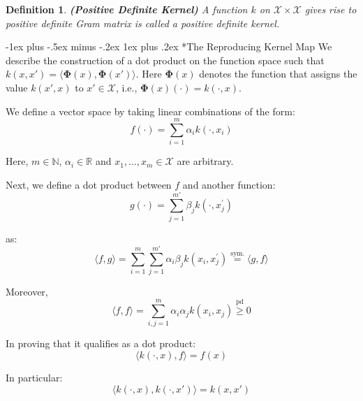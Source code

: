 \documentclass[10pt,landscape]{article}
\makeatletter
\newtheorem*{definition*}{Definition}
\renewcommand{\subsubsection}{\@startsection{subsubsection}{3}{0mm}%
                                {-1ex plus -.5ex minus -.2ex}%
                                {1ex plus .2ex}%
                                {\normalfont\small\bfseries}}
\makeatother
\begin{document}
\begin{multicols}{3}
\begin{definition*}
\textbf{(Positive Definite Kernel)} A function $k$ on $\mathcal{X} \times \mathcal{X}$ gives rise to positive definite Gram matrix is called a positive definite kernel.
\end{definition*}

\subsubsection*{The Reproducing Kernel Map}
We describe the construction of a dot product on the function space such that $k(x,x')=\langle \mathbf{\Phi}(x), \mathbf{\Phi}(x')\rangle$. Here $\mathbf{\Phi}(x)$ denotes the function that assigns the value $k(x',x)$ to $x' \in \mathcal{X}$, i.e., $\mathbf{\Phi}(x)(\cdot) = k(\cdot,x)$.

We define a vector space by taking linear combinations of the form:
\begin{equation*}
f(\cdot) = \sum_{i=1}^{m} \alpha_i k \left( \cdot, x_i \right)
\end{equation*}

Here, $m \in \mathbb{N}$, $\alpha_i \in \mathbb{R}$ and $x_1, \dots, x_m \in \mathcal{X}$ are arbitrary.

Next, we define a dot product between $f$ and another function:
\begin{equation*}
g(\cdot) = \sum_{j=1}^{m'} \beta_j k \left( \cdot, x_j^{'} \right)
\end{equation*}

as:
\begin{equation*}
\langle f, g \rangle = \sum_{i=1}^{m}\sum_{j=1}^{m'} \alpha_i \beta_j k \left( x_i, x_j^{'} \right) \stackrel{\textrm{sym.}}{=} \langle g, f \rangle
\end{equation*}

Moreover,
\begin{equation*}
\langle f, f \rangle = \sum_{i, j=1}^{m}\alpha_i \alpha_j k \left( x_i, x_j \right) \stackrel{\textrm{pd}}{\geq} 0
\end{equation*}

In proving that it qualifies as a dot product:
\begin{equation*}
\langle k(\cdot, x), f \rangle = f(x)
\end{equation*}

In particular:
\begin{equation*}
\langle k(\cdot, x), k(\cdot, x') \rangle = k(x, x')
\end{equation*}


\end{multicols}
\end{document}
